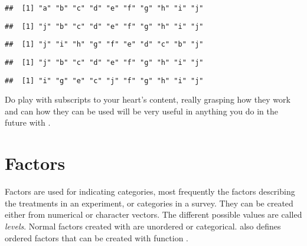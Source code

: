 \documentclass[paper=a4,10pt,div=17,headsepline,BCOR=12mm,twoside,open=right]{scrbook}\usepackage{knitr}
\begin{document}
\begin{knitrout}\footnotesize
{}\color{fgcolor}\begin{kframe}
\begin{alltt}
 \hlkwb{<-} \hlstd{letters[}\hlopt{:}\hlstd{]}
\end{alltt}
\begin{verbatim}
##  [1] "a" "b" "c" "d" "e" "f" "g" "h" "i" "j"
\end{verbatim}
\begin{alltt}
\hlstd{a[}\hlstd{]} \hlkwb{<-} \hlstd{a[}\hlstd{]}
\end{alltt}
\begin{verbatim}
##  [1] "j" "b" "c" "d" "e" "f" "g" "h" "i" "j"
\end{verbatim}
\begin{alltt}
 \hlkwb{<-} \hlstd{a[}\hlopt{:}\hlstd{]}
\end{alltt}
\begin{verbatim}
##  [1] "j" "i" "h" "g" "f" "e" "d" "c" "b" "j"
\end{verbatim}
\begin{alltt}
\hlstd{a[}\hlopt{:}\hlstd{]} \hlkwb{<-} 
\end{alltt}
\begin{verbatim}
##  [1] "j" "b" "c" "d" "e" "f" "g" "h" "i" "j"
\end{verbatim}
\begin{alltt}
\hlstd{a[}\hlopt{:}\hlstd{]} \hlkwb{<-} \hlstd{a[}\hlstd{(}\hlstd{,}\hlstd{)]}
\end{alltt}
\begin{verbatim}
##  [1] "i" "g" "e" "c" "j" "f" "g" "h" "i" "j"
\end{verbatim}
\end{kframe}
\end{knitrout}

Do play with subscripts to your heart's content, really grasping how they work and can how they can be used will be very useful in anything you do in the future with \R.

\section{Factors}

Factors are used for indicating categories, most frequently the factors describing the treatments in an experiment, or categories in a survey. They can be created either from numerical or character vectors. The different possible values are called \emph{levels}. Normal factors created with  are unordered or categorical. \R also defines ordered factors that can be created with function .
\end{document}

